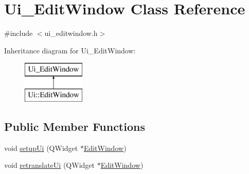 \hypertarget{class_ui___edit_window}{}\section{Ui\+\_\+\+Edit\+Window Class Reference}
\label{class_ui___edit_window}


{\ttfamily \#include $<$ui\+\_\+editwindow.\+h$>$}

Inheritance diagram for Ui\+\_\+\+Edit\+Window\+:\begin{figure}[H]
\begin{center}
\leavevmode
\includegraphics[height=2.000000cm]{class_ui___edit_window}
\end{center}
\end{figure}
\subsection*{Public Member Functions}
\begin{DoxyCompactItemize}
\item 
void \mbox{\hyperlink{class_ui___edit_window_a73e4228c854ad2e662f738054844fdc3}{setup\+Ui}} (Q\+Widget $\ast$\mbox{\hyperlink{class_edit_window}{Edit\+Window}})
\item 
void \mbox{\hyperlink{class_ui___edit_window_a49415a0f0f9abdd22402b5adb5970a0f}{retranslate\+Ui}} (Q\+Widget $\ast$\mbox{\hyperlink{class_edit_window}{Edit\+Window}})
\end{DoxyCompactItemize}
